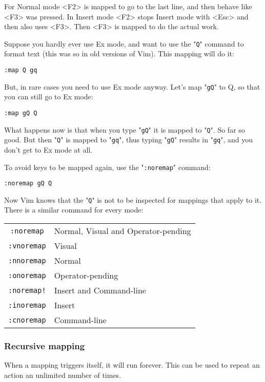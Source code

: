 {For Normal mode <F2> is mapped to go to the last line, and then behave like <F3> was pressed.
In Insert mode <F2> stops Insert mode with <Esc> and then also uses <F3>.
Then <F3> is mapped to do the actual work.

Suppose you hardly ever use Ex mode, and want to use the "\verb!Q!" command to format text (this was so in old versions of Vim).
This mapping will do it:

\begin{Verbatim}[samepage=true]
 :map Q gq
\end{Verbatim}

But, in rare cases you need to use Ex mode anyway.
Let's map "\verb!gQ!" to Q, so that you can still go to Ex mode:

\begin{Verbatim}[samepage=true]
 :map gQ Q
\end{Verbatim}

What happens now is that when you type "\verb!gQ!" it is mapped to "\verb!Q!".
So far so good.
But then "\verb!Q!" is mapped to "\verb!gq!", thus typing "\verb!gQ!" results in "\verb!gq!", and you don't get to Ex mode at all.

To avoid keys to be mapped again, use the "\verb!:noremap!" command:

\begin{Verbatim}[samepage=true]
 :noremap gQ Q
\end{Verbatim}

Now Vim knows that the "\verb!Q!" is not to be inspected for mappings that apply to it.
There is a similar command for every mode:

\begin{center} \begin{tabular}{c l}
				\verb!:noremap! & Normal, Visual and Operator-pending \\
				\verb!:vnoremap! & Visual \\
				\verb!:nnoremap! & Normal \\
				\verb!:onoremap! & Operator-pending \\
				\verb;:noremap!; & Insert and Command-line \\
				\verb!:inoremap! & Insert \\
				\verb!:cnoremap! & Command-line \\
\end{tabular} \end{center}
\subsubsection{Recursive mapping}
When a mapping triggers itself, it will run forever.
This can be used to repeat an action an unlimited number of times.

}
